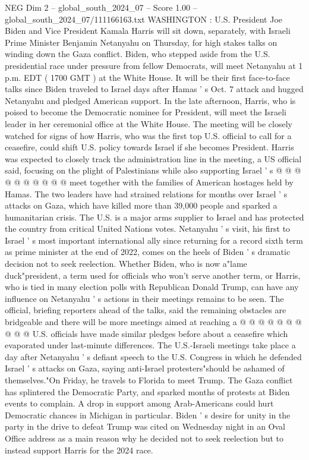 \begin{textsample}{NEG Dim 2 – global\_south\_2024\_07 – Score 1.00 – global\_south\_2024\_07/111166163.txt}  \label{ex:f2_neg_288}
WASHINGTON : U.S.
President Joe Biden and Vice President Kamala Harris will sit down, separately, with Israeli Prime Minister Benjamin Netanyahu on Thursday, for high stakes talks on winding down the Gaza conflict.
Biden, who stepped aside from the U.S. presidential race under pressure from fellow Democrats, will meet Netanyahu at 1 p.m.
EDT ( 1700 GMT ) at the White House.
It will be their first face-to-face talks since Biden traveled to Israel days after Hamas ' s Oct. 7 attack and hugged Netanyahu and pledged American support.
In the late afternoon, Harris, who is poised to become the Democratic nominee for President, will meet the Israeli leader in her ceremonial office at the White House.
The meeting will be closely watched for signs of how Harris, who was the first top U.S. official to call for a ceasefire, could shift U.S. policy towards Israel if she becomes President.
Harris was expected to closely track the administration line in the meeting, a US official said, focusing on the plight of Palestinians while also supporting Israel ' s @ @ @ @ @ @ @ @ @ @ meet together with the families of American hostages held by Hamas.
The two leaders have had strained relations for months over Israel ' s attacks on Gaza, which have killed more than 39,000 people and sparked a humanitarian crisis.
The U.S. is a major arms supplier to Israel and has protected the country from critical United Nations votes.
Netanyahu ' s visit, his first to Israel ' s most important international ally since returning for a record sixth term as prime minister at the end of 2022, comes on the heels of Biden ' s dramatic decision not to seek reelection.
Whether Biden, who is now a"lame duck"president, a term used for officials who won't serve another term, or Harris, who is tied in many election polls with Republican Donald Trump, can have any influence on Netanyahu ' s actions in their meetings remains to be seen.
The official, briefing reporters ahead of the talks, said the remaining obstacles are bridgeable and there will be more meetings aimed at reaching a @ @ @ @ @ @ @ @ @ @ U.S. officials have made similar pledges before about a ceasefire which evaporated under last-minute differences.
The U.S.-Israeli meetings take place a day after Netanyahu ' s defiant speech to the U.S.
Congress in which he defended Israel ' s attacks on Gaza, saying anti-Israel protesters"should be ashamed of themselves."On Friday, he travels to Florida to meet Trump.
The Gaza conflict has splintered the Democratic Party, and sparked months of protests at Biden events to complain.
A drop in support among Arab-Americans could hurt Democratic chances in Michigan in particular.
Biden ' s desire for unity in the party in the drive to defeat Trump was cited on Wednesday night in an Oval Office address as a main reason why he decided not to seek reelection but to instead support Harris for the 2024 race.

\end{textsample}
